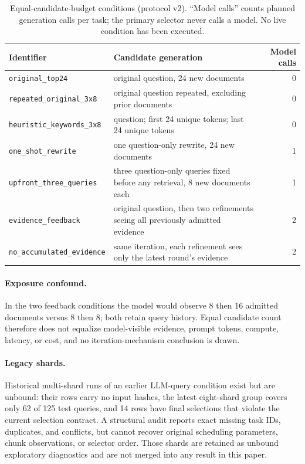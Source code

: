 \begin{table}[h]
\centering
\small
\caption{Equal-candidate-budget conditions (protocol v2). ``Model calls'' counts planned generation calls per task; the primary selector never calls a model. No live condition has been executed.}
\label{tab:conditions}
\begin{tabular}{@{}l>{\raggedright\arraybackslash}p{7.1cm}r@{}}
\toprule
Identifier & Candidate generation & Model calls \\
\midrule
\texttt{original\_top24} & original question, 24 new documents & 0 \\
\texttt{repeated\_original\_3x8} & original question repeated, excluding prior documents & 0 \\
\texttt{heuristic\_keywords\_3x8} & question; first 24 unique tokens; last 24 unique tokens & 0 \\
\texttt{one\_shot\_rewrite} & one question-only rewrite, 24 new documents & 1 \\
\texttt{upfront\_three\_queries} & three question-only queries fixed before any retrieval, 8 new documents each & 1 \\
\texttt{evidence\_feedback} & original question, then two refinements seeing all previously admitted evidence & 2 \\
\texttt{no\_accumulated\_evidence} & same iteration, each refinement sees only the latest round's evidence & 2 \\
\bottomrule
\end{tabular}
\end{table}

\paragraph{Exposure confound.}
In the two feedback conditions the model would observe 8 then 16 admitted documents versus 8 then 8; both retain query history. Equal candidate count therefore does not equalize model-visible evidence, prompt tokens, compute, latency, or cost, and no iteration-mechanism conclusion is drawn.

\paragraph{Legacy shards.}
Historical multi-shard runs of an earlier LLM-query condition exist but are unbound: their rows carry no input hashes, the latest eight-shard group covers only 62 of 125 test queries, and 14 rows have final selections that violate the current selection contract. A structural audit reports exact missing task IDs, duplicates, and conflicts, but cannot recover original scheduling parameters, chunk observations, or selector order. Those shards are retained as unbound exploratory diagnostics and are not merged into any result in this paper.

